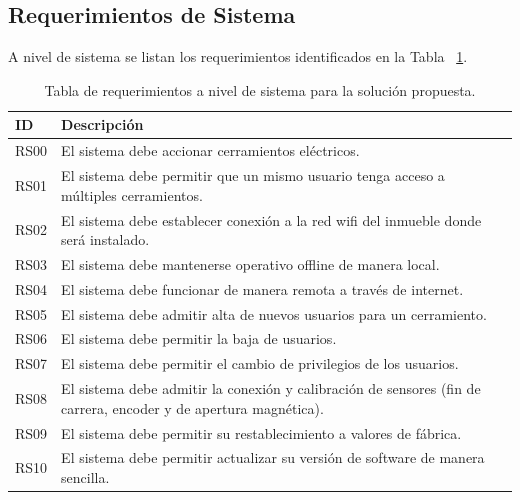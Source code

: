 \subsection{Requerimientos de Sistema}
A nivel de sistema se listan los requerimientos identificados en la Tabla ~\ref{table:req_sistemas}.
\begin{table}[ht]
	\begin{tabular}{|l|m{12cm}|}
		\hline
		\textbf{ID} & \textbf{Descripción}                                                                                             \\ \hline
		RS00        & El sistema debe accionar cerramientos eléctricos.                                                                \\ \hline
		RS01        & El sistema debe permitir que un mismo usuario tenga acceso a múltiples cerramientos.                             \\ \hline
		RS02        & El sistema debe establecer conexión a la red wifi del inmueble donde será instalado.                             \\ \hline
		RS03        & El sistema debe mantenerse operativo offline de manera local.                                                    \\ \hline
		RS04        & El sistema debe funcionar de manera remota a través de internet.                                                 \\ \hline
		RS05        & El sistema debe admitir alta de nuevos usuarios para un cerramiento.                                             \\ \hline
		RS06        & El sistema debe permitir la baja de usuarios.                                                                    \\ \hline
		RS07        & El sistema debe permitir el cambio de privilegios de los usuarios.                                               \\ \hline
		RS08        & El sistema debe admitir la conexión y calibración de sensores (fin de carrera, encoder y de apertura magnética). \\ \hline
		RS09        & El sistema debe permitir su restablecimiento a valores de fábrica.                                               \\ \hline
		RS10        & El sistema debe permitir actualizar su versión de software de manera sencilla.                                   \\ \hline
	\end{tabular}
	\caption[Requerimientos de Sistema]{Tabla de requerimientos a nivel de sistema para la solución propuesta.}
	\label{table:req_sistemas}
\end{table}
